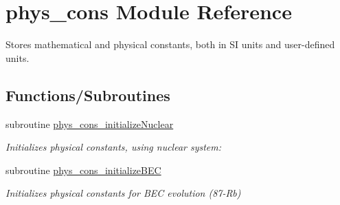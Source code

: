 \hypertarget{namespacephys__cons}{
\section{phys\_\-cons Module Reference}
\label{namespacephys__cons}
}


Stores mathematical and physical constants, both in SI units and user-\/defined units.  


\subsection*{Functions/Subroutines}
\begin{DoxyCompactItemize}
\item 
subroutine \hyperlink{namespacephys__cons_ab13f84d8b6f574eb73870a2964a82b8b}{phys\_\-cons\_\-initializeNuclear}
\begin{DoxyCompactList}\small\item\em Initializes physical constants, using nuclear system: \item\end{DoxyCompactList}\item 
subroutine \hyperlink{namespacephys__cons_ae56f25b6648518608cb32e16cfce196e}{phys\_\-cons\_\-initializeBEC}
\begin{DoxyCompactList}\small\item\em Initializes physical constants for BEC evolution (87-\/Rb) \item\end{DoxyCompactList}\end{DoxyCompactItemize}
